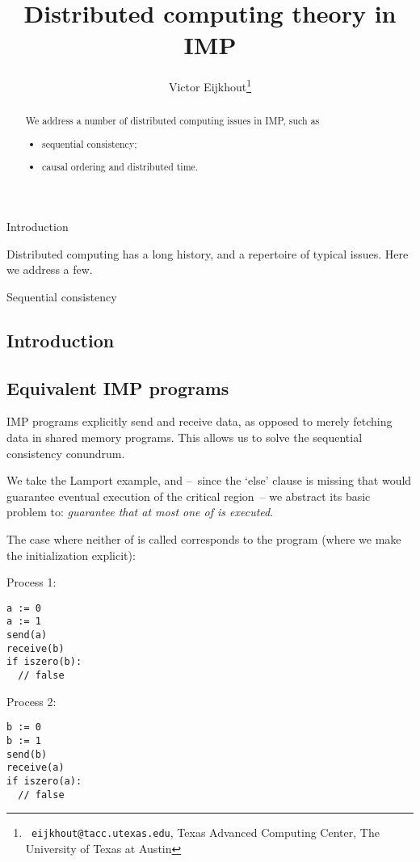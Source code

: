 \documentclass[11pt,fleqn,preprint]{impreport}
\title[distributed theory IMP]{Distributed computing theory in IMP}
\author[Eijkhout]{Victor Eijkhout\thanks{{\tt
      eijkhout@tacc.utexas.edu}, Texas Advanced Computing Center, The
    University of Texas at Austin}}
\begin{document}
\maketitle

\begin{abstract}
  We address a number of distributed computing issues in IMP, such as
  \begin{itemize}
  \item sequential consistency;
  \item causal ordering and distributed time.
  \end{itemize}
\end{abstract}

\acresetall

 {Introduction}

Distributed computing has a long history, and a repertoire of
typical issues. Here we address a few.

 {Sequential consistency}

\subsection{Introduction}



\subsection{Equivalent IMP programs}

IMP programs explicitly send and receive data, as opposed to merely
fetching data in shared memory programs. This allows us to solve the
sequential consistency conundrum.

We take the Lamport example, and --~since the `else' clause is missing
that would guarantee eventual execution of the critical region~-- we
abstract its basic problem to: \textsl{guarantee that at most one of
   is executed}.

The case where neither of  is called corresponds to the
program (where we make the initialization explicit):
\begin{multicols}{2}
  Process 1:
\begin{verbatim}
a := 0
a := 1
send(a)
receive(b)
if iszero(b):
  // false
\end{verbatim}
\columnbreak
Process 2:
\begin{verbatim}
b := 0
b := 1
send(b)
receive(a)
if iszero(a):
  // false  
\end{verbatim}
\end{multicols}
\end{document}
